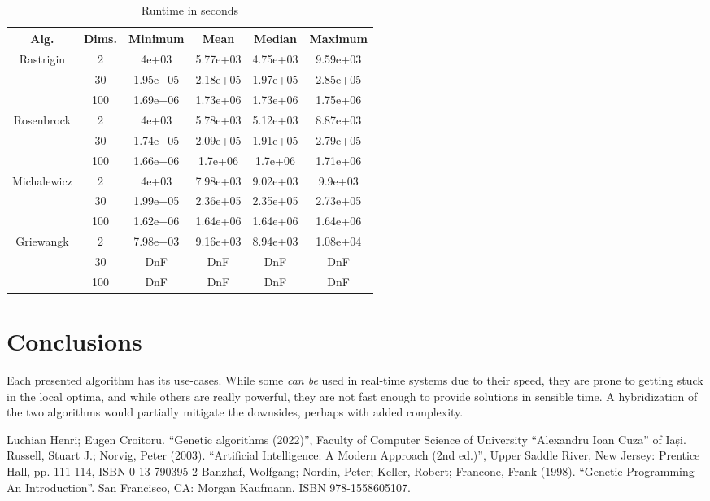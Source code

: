 \documentclass[conference]{IEEEtran}
\begin{document}
\begin{table}[!htbp]
    \caption{Runtime in seconds}
    \centering
    \begin{tabular}{|c c|c c c c|}
        \hline
        Alg. & Dims. & Minimum & Mean & Median & Maximum \\
        \hline
        \multirow{3}{*}{Rastrigin} & 2 & 4e+03 & 5.77e+03 & 4.75e+03 & 9.59e+03 \\
        & 30 & 1.95e+05 & 2.18e+05 & 1.97e+05 & 2.85e+05 \\
        & 100 & 1.69e+06 & 1.73e+06 & 1.73e+06 & 1.75e+06 \\
        \hline
        \multirow{3}{*}{Rosenbrock} & 2 & 4e+03 & 5.78e+03 & 5.12e+03 & 8.87e+03 \\
        & 30 & 1.74e+05 & 2.09e+05 & 1.91e+05 & 2.79e+05 \\
        & 100 & 1.66e+06 & 1.7e+06 & 1.7e+06 & 1.71e+06 \\
        \hline
        \multirow{3}{*}{Michalewicz} & 2 & 4e+03 & 7.98e+03 & 9.02e+03 & 9.9e+03 \\
        & 30 & 1.99e+05 & 2.36e+05 & 2.35e+05 & 2.73e+05 \\
        & 100 & 1.62e+06 & 1.64e+06 & 1.64e+06 & 1.64e+06 \\
        \hline
        \multirow{3}{*}{Griewangk} & 2 & 7.98e+03 & 9.16e+03 & 8.94e+03 & 1.08e+04 \\
        & 30 & DnF & DnF & DnF & DnF \\
        & 100 & DnF & DnF & DnF & DnF \\
        \hline
    \end{tabular}
\end{table}

\pagebreak

\section{Conclusions}
Each presented algorithm has its use-cases. While some \textit{can be} used in real-time systems due to their speed,
they are prone to getting stuck in the local optima, and while others are really powerful, they are not fast enough
to provide solutions in sensible time. A hybridization of the two algorithms would partially mitigate the downsides, perhaps
with added complexity.

\begin{thebibliography}{00}
 Luchian Henri; Eugen Croitoru. ``Genetic algorithms (2022)'', Faculty of Computer Science of University ``Alexandru Ioan Cuza'' of Iași.
 Russell, Stuart J.; Norvig, Peter (2003). ``Artificial Intelligence: A Modern Approach (2nd ed.)'', Upper Saddle River, New Jersey: Prentice Hall, pp. 111-114, ISBN 0-13-790395-2 
 Banzhaf, Wolfgang; Nordin, Peter; Keller, Robert; Francone, Frank (1998). ``Genetic Programming - An Introduction''. San Francisco, CA: Morgan Kaufmann. ISBN 978-1558605107.
\end{thebibliography}
\end{document}
